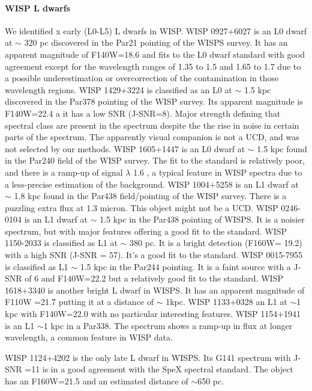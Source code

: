 \documentclass[manuscript]{aastex63}
\begin{document}
\paragraph{WISP L dwarfs}
We identified x early (L0-L5) L dwarfs in WISP. WISP 0927+6027 is an L0 dwarf at $\sim$ 320 pc discovered in the Par21 pointing of the WISPS survey. It has an apparent magnitude of F140W=18.6 and fits to the L0 dwarf standard with good agreement except for the wavelength ranges of 1.35 to 1.5 \micron and 1.65 to 1.7 \micron due to a possible underestimation or overcorrection of the contamination in those wavelength regions. WISP 1429+3224 is classified as an L0 at $\sim$ 1.5 kpc discovered in the Par378 pointing of the WISP survey. Its apparent magnitude is F140W=22.4 a it has a low SNR (J-SNR=8). Major \wat strength defining that spectral class are present in the spectrum despite the the rise in noise in certain parts of the spectrum. The apparently visual companion is not a UCD, and was not selected by our methods. WISP 1605+1447 is an L0 dwarf at $\sim$ 1.5 kpc found in the Par240 field of the WISP survey. The fit to the standard is relatively poor, and there is a ramp-up of signal $\lambda$ 1.6 \micron, a typical feature in WISP spectra due to a less-precise estimation of the background. WISP 1004+5258 is an L1 dwarf at $\sim$ 1.8 kpc found in the Par438 field/pointing of the WISP survey. There is a puzzling extra flux at 1.3 micron. This object might not be a UCD. WISP 0246-0104 is an L1 dwarf at $\sim$ 1.5 kpc in the Par438 pointing of WISPS. It is a noisier spectrum, but with major features offering a good fit to the standard. WISP 1150-2033 is classified as L1 at $\sim$ 380 pc. It is a bright detection (F160W= 19.2) with a high SNR (J-SNR = 57). It's a good fit to the standard. WISP 0015-7955 is classified as L1 $\sim$ 1.5 kpc in the Par244 pointing. It is a faint source with a J-SNR of 6 and F140W=22.2 but a relatively good fit to the standard. WISP 1618+3340 is another bright L dwarf in WISPS. It has an apparent magnitude of F110W =21.7 putting it at a distance of $\sim$ 1kpc.  WISP 1133+0328 an L1 at $\sim$1 kpc with F140W=22.0  with no particular interesting features. WISP 1154+1941 is an L1 $\sim$1 kpc in a Par338. The spectrum shows a ramp-up in flux at longer wavelength, a common feature in WISP data. 

WISP 1124+4202 is the only late L dwarf in WISPS. Its G141 spectrum with J-SNR =11 is in a good agreement with the SpeX spectral standard. The object has an F160W=21.5 and an estimated distance of $\sim$650 pc.
\end{document}

